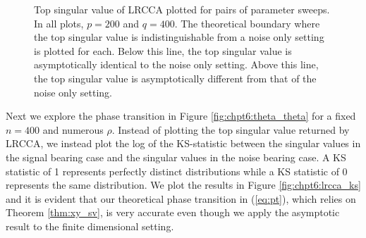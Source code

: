 \begin{figure}[!htbp]
{  }
  \caption{Top singular value of LRCCA plotted for pairs of parameter sweeps. In all
    plots, $p=200$ and $q=400$. The theoretical boundary where the top singular value is
    indistinguishable from a noise only setting is plotted for each. Below this line, the
    top singular value is asymptotically identical to the noise only setting. Above this
    line, the top singular value is asymptotically different from that of the noise only
    setting.}
  \label{fig:chpt6:lrcca_pt}
\end{figure}

Next we explore the phase transition in Figure \ref{fig:chpt6:theta_theta} for a fixed $n=400$
and numerous $\rho$. Instead of plotting the top singular value returned by LRCCA, we
instead plot the log of the KS-statistic between the singular values in the signal bearing case
and the singular values in the noise bearing case. A KS statistic of 1 represents
perfectly distinct distributions while a KS statistic of 0 represents the same
distribution. We plot the results in Figure \ref{fig:chpt6:lrcca_ks} and it is evident
that our theoretical phase transition in (\ref{eq:pt}), which relies on Theorem
\ref{thm:xy_sv}, is very accurate even though we apply the asymptotic result to the finite
dimensional setting.  


